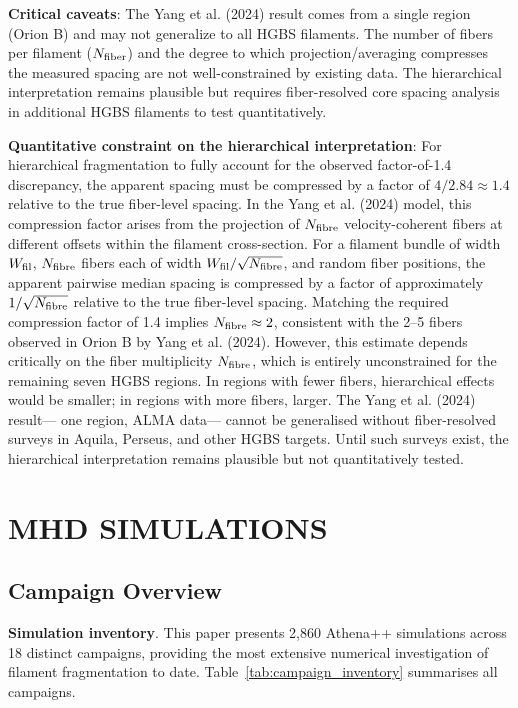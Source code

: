 \documentclass[twocolumn]{mnras}
\begin{document}
\textbf{Critical caveats}: The Yang et al. (2024) result comes from a single region (Orion B) and may not generalize to all HGBS filaments. The number of fibers per filament ($N_{\rm fiber}$) and the degree to which projection/averaging compresses the measured spacing are not well-constrained by existing data. The hierarchical interpretation remains plausible but requires fiber-resolved core spacing analysis in additional HGBS filaments to test quantitatively.

\textbf{Quantitative constraint on the hierarchical interpretation}: For hierarchical fragmentation to fully account for the observed factor-of-1.4 discrepancy, the apparent spacing must be compressed by a factor of $4/2.84 \approx 1.4$ relative to the true fiber-level spacing. In the Yang et al. (2024) model, this compression factor arises from the projection of $N_{\rm fibre}$ velocity-coherent fibers at different offsets within the filament cross-section. For a filament bundle of width $W_{\rm fil}$, $N_{\rm fibre}$ fibers each of width $W_{\rm fil}/\sqrt{N_{\rm fibre}}$, and random fiber positions, the apparent pairwise median spacing is compressed by a factor of approximately $1/\sqrt{N_{\rm fibre}}$ relative to the true fiber-level spacing. Matching the required compression factor of 1.4 implies $N_{\rm fibre} \approx 2$, consistent with the 2--5 fibers observed in Orion B by Yang et al. (2024). However, this estimate depends critically on the fiber multiplicity $N_{\rm fibre}$, which is entirely unconstrained for the remaining seven HGBS regions. In regions with fewer fibers, hierarchical effects would be smaller; in regions with more fibers, larger. The Yang et al. (2024) result— one region, ALMA data— cannot be generalised without fiber-resolved surveys in Aquila, Perseus, and other HGBS targets. Until such surveys exist, the hierarchical interpretation remains plausible but not quantitatively tested.

\section{MHD SIMULATIONS}

\subsection{Campaign Overview}

\textbf{Simulation inventory}. This paper presents 2,860 Athena++ simulations across 18 distinct campaigns, providing the most extensive numerical investigation of filament fragmentation to date. Table~\ref{tab:campaign_inventory} summarises all campaigns.
\end{document}
